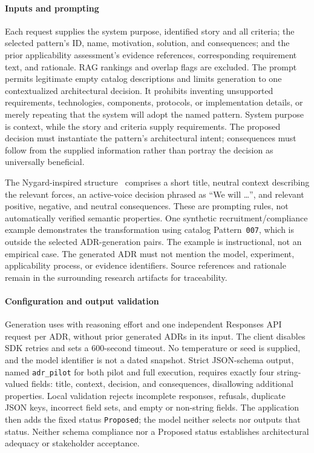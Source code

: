 \paragraph{Inputs and prompting}
Each request supplies the system purpose, identified story and all criteria;
the selected pattern's ID, name, motivation, solution, and consequences; and
the prior applicability assessment's evidence references, corresponding
requirement text, and rationale. RAG rankings and overlap flags are excluded.
The prompt permits legitimate empty catalog descriptions and limits generation
to one contextualized architectural decision. It prohibits inventing
unsupported requirements, technologies, components, protocols, or implementation
details, or merely repeating that the system will adopt the named pattern.
System purpose is context, while the story and criteria supply requirements.
The proposed decision must instantiate the pattern's architectural intent;
consequences must follow from the supplied information rather than portray
the decision as universally beneficial.

The Nygard-inspired structure~\cite{nygard2011adr} comprises a short title,
neutral context describing the relevant forces, an active-voice decision
phrased as ``We will \ldots'', and relevant positive, negative, and neutral
consequences. These are prompting rules, not automatically verified semantic
properties. One synthetic recruitment/compliance example demonstrates the
transformation using catalog Pattern~\texttt{007}, which is outside the
selected ADR-generation pairs. The example is instructional, not an empirical
case. The generated ADR must not mention the model, experiment, applicability
process, or evidence identifiers. Source references and rationale remain in
the surrounding research artifacts for traceability.

\paragraph{Configuration and output validation}
Generation uses \texttt{\AdrModel} with reasoning effort
\texttt{\AdrReasoningEffort} and one independent Responses API request per
ADR, without prior generated ADRs in its input. The client disables SDK
retries and sets a 600-second timeout. No temperature or seed is supplied,
and the model identifier is not a dated snapshot. Strict JSON-schema output,
named \texttt{adr\_pilot} for both pilot and full execution, requires exactly
four string-valued fields: title, context, decision, and consequences,
disallowing additional properties. Local validation rejects incomplete
responses, refusals, duplicate JSON keys, incorrect field sets, and empty or
non-string fields. The application then adds the fixed status
\texttt{Proposed}; the model neither selects nor outputs that status.
Neither schema compliance nor a Proposed status establishes architectural
adequacy or stakeholder acceptance.


